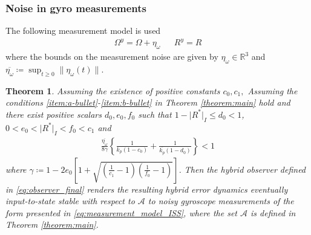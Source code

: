 \documentclass{article}
\newcommand{\R}[1]{\mathbb{R}^{#1}}
\newcommand{\Omegay}{\Omega^y}
\newtheorem{theorem}{Theorem}
\newcommand{\brackets}[1]{\left(#1\right)}
\newcommand{\normSOthree}[1]{{{\vert}#1 {\vert}_I}}
\newcommand{\Rstar}{{R^*}}
\newcommand{\noisegyro}{\eta_\omega}
\newcommand{\maxnoisegyro}{\overline{\eta_\omega}}
\begin{document}
\subsubsection{Noise in gyro measurements}
The following measurement model is used
\begin{align}\label{eq:measurement_model_ISS}
    \Omegay = \Omega + \noisegyro && R^y = R 
\end{align}
where the bounds on the measurement noise are given by $\noisegyro\in\R{3}$ and $\overline{\noisegyro}\coloneqq\sup_{t\geq 0} \|\noisegyro(t)\|$.
\begin{theorem}\label{theorem:PCF_ISS_gyro}
    Assuming the existence of positive constants $c_0, c_1, $
    Assuming the conditions \ref{item:a-bullet}-\ref{item:b-bullet} in Theorem \ref{theorem:main} hold and there exist positive scalars $d_0, e_0, f_0$ such that $1 - \normSOthree{\Rstar}\leq d_0 < 1$, $0 < e_0 < \normSOthree{\Rstar} < f_0 < c_1$ and
    \begin{align*}
        \frac{\maxnoisegyro}{8\gamma}\left\{\frac{1}{k_p(1-c_0)} + \frac{1}{\overline{k_p}(1-d_0)}\right\} < 1
    \end{align*}
    where $\gamma \coloneqq {1 - 2e_0\left[1 + \sqrt{\brackets{\frac{1}{c_1}-1}\brackets{\frac{1}{f_0}-1}}\right]}$. Then the hybrid observer defined in \eqref{eq:observer_final} renders the resulting hybrid error dynamics {eventually input-to-state stable} with respect to $\mathcal{A}$ to noisy gyroscope measurements of the form presented in \eqref{eq:measurement_model_ISS}, where the set $\mathcal{A}$ is defined in Theorem \ref{theorem:main}. 
\end{theorem}
\end{document}

